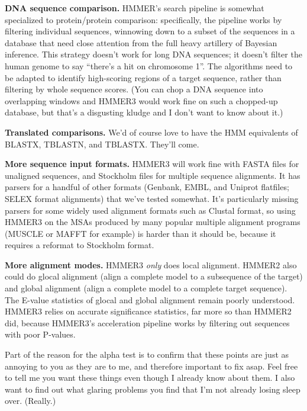 \textbf{DNA sequence comparison.} HMMER's search pipeline is somewhat
specialized to protein/protein comparison: specifically, the pipeline
works by filtering individual sequences, winnowing down to a subset of
the sequences in a database that need close attention from the full
heavy artillery of Bayesian inference. This strategy doesn't work for
long DNA sequences; it doesn't filter the human genome to say
``there's a hit on chromosome 1''. The algorithms need to be adapted
to identify high-scoring regions of a target sequence, rather than
filtering by whole sequence scores. (You can chop a DNA sequence into
overlapping windows and HMMER3 would work fine on such a chopped-up
database, but that's a disgusting kludge and I don't want to know
about it.)

\textbf{Translated comparisons.} We'd of course love to have the HMM
equivalents of BLASTX, TBLASTN, and TBLASTX. They'll come.

\textbf{More sequence input formats.} HMMER3 will work fine with FASTA
files for unaligned sequences, and Stockholm files for multiple
sequence alignments. It has parsers for a handful of other formats
(Genbank, EMBL, and Uniprot flatfiles; SELEX format alignments) that
we've tested somewhat. It's particularly missing parsers for some
widely used alignment formats such as Clustal format, so using HMMER3
on the MSAs produced by many popular multiple alignment programs
(MUSCLE or MAFFT for example) is harder than it should be, because it
requires a reformat to Stockholm format.

\textbf{More alignment modes.} HMMER3 \emph{only} does local
alignment. HMMER2 also could do glocal alignment (align a complete
model to a subsequence of the target) and global alignment (align a
complete model to a complete target sequence). The E-value statistics
of glocal and global alignment remain poorly understood. HMMER3 relies
on accurate significance statistics, far more so than HMMER2 did,
because HMMER3's acceleration pipeline works by filtering out
sequences with poor P-values.

\begin{sidebar}
Part of the reason for the alpha test is to confirm that these points
are just as annoying to you as they are to me, and therefore important
to fix asap. Feel free to tell me you want these things even though I
already know about them. I also want to find out what glaring problems
you find that I'm not already losing sleep over. (Really.)
\end{sidebar}



